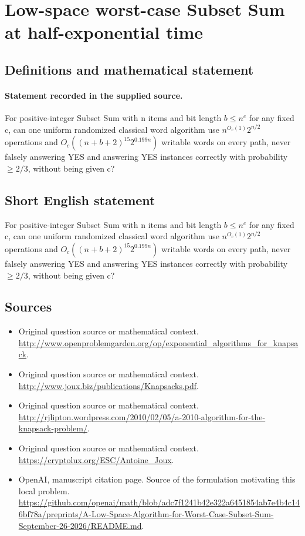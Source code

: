 \documentclass[11pt]{article}
\begin{document}
\section*{Low-space worst-case Subset Sum at half-exponential time}\label{statement}
\subsection{Definitions and mathematical statement}
\paragraph{Statement recorded in the supplied source.}
For positive-integer Subset Sum with n items and bit length $b\leq n^c$ for any fixed c, can one uniform randomized classical word algorithm use $n^{O_c(1)}2^{n/2}$ operations and $O_c((n+b+2)^{15}2^{0.199n})$ writable words on every path, never falsely answering YES and answering YES instances correctly with probability $\geq 2/3$, without being given c?
\subsection{Short English statement}
For positive-integer Subset Sum with n items and bit length $b\leq n^c$ for any fixed c, can one uniform randomized classical word algorithm use $n^{O_c(1)}2^{n/2}$ operations and $O_c((n+b+2)^{15}2^{0.199n})$ writable words on every path, never falsely answering YES and answering YES instances correctly with probability $\geq 2/3$, without being given c?
\subsection{Sources}
\begin{itemize}
\item[S1] Original question source or mathematical context.
\url{http://www.openproblemgarden.org/op/exponential_algorithms_for_knapsack}.
\item[S2] Original question source or mathematical context.
\url{http://www.joux.biz/publications/Knapsacks.pdf}.
\item[S3] Original question source or mathematical context.
\url{http://rjlipton.wordpress.com/2010/02/05/a-2010-algorithm-for-the-knapsack-problem/}.
\item[S4] Original question source or mathematical context.
\url{https://cryptolux.org/ESC/Antoine_Joux}.
\item[S5] OpenAI, manuscript citation page. Source of the formulation motivating this local problem.
\url{https://github.com/openai/math/blob/adc7f1241b42e322a6451854ab7e4b4c146bf78a/preprints/A-Low-Space-Algorithm-for-Worst-Case-Subset-Sum-September-26-2026/README.md}.
\end{itemize}
\end{document}
